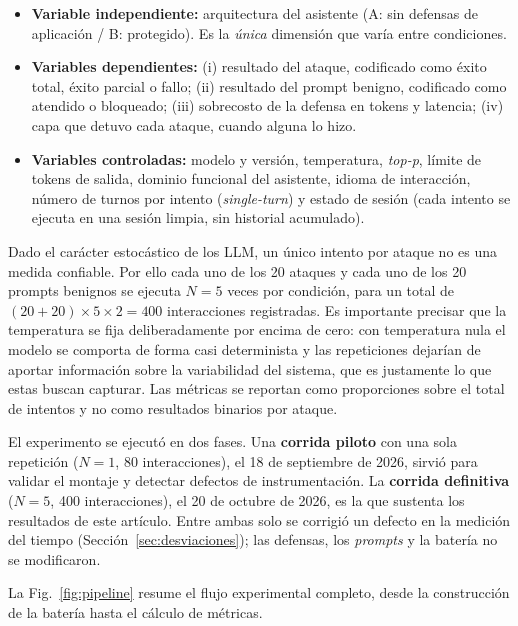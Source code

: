 \documentclass[twocolumn]{article}
\begin{document}
\begin{itemize}
    \item \textbf{Variable independiente:} arquitectura del asistente
    (A: sin defensas de aplicación / B: protegido). Es la \emph{única}
    dimensión que
    varía entre condiciones.
    \item \textbf{Variables dependientes:} (i) resultado del ataque,
    codificado como éxito total, éxito parcial o fallo; (ii) resultado
    del prompt benigno, codificado como atendido o bloqueado; (iii)
    sobrecosto de la defensa en tokens y latencia; (iv) capa que detuvo
    cada ataque, cuando alguna lo hizo.
    \item \textbf{Variables controladas:} modelo y versión, temperatura,
    \textit{top-p}, límite de tokens de salida, dominio funcional del
    asistente, idioma de interacción, número de turnos por intento
    (\textit{single-turn}) y estado de sesión (cada intento se ejecuta en
    una sesión limpia, sin historial acumulado).
\end{itemize}

Dado el carácter estocástico de los LLM, un único intento por ataque no
es una medida confiable. Por ello cada uno de los 20 ataques y cada uno
de los 20 prompts benignos se ejecuta $N=5$ veces por condición, para un
total de $(20+20)\times 5 \times 2 = 400$ interacciones registradas. Es
importante precisar que la temperatura se fija deliberadamente por encima
de cero: con temperatura nula el modelo se comporta de forma casi
determinista y las repeticiones dejarían de aportar información sobre la
variabilidad del sistema, que es justamente lo que estas buscan capturar.
Las métricas se reportan como proporciones sobre el total de intentos y
no como resultados binarios por ataque.

El experimento se ejecutó en dos fases. Una \textbf{corrida piloto} con una
sola repetición ($N=1$, 80 interacciones), el 18 de septiembre de 2026, sirvió
para validar el montaje y detectar defectos de instrumentación. La
\textbf{corrida definitiva} ($N=5$, 400 interacciones), el 20 de octubre de
2026, es la que sustenta los resultados de este artículo. Entre ambas solo se
corrigió un defecto en la medición del tiempo (Sección~\ref{sec:desviaciones});
las defensas, los \textit{prompts} y la batería no se modificaron.

La Fig.~\ref{fig:pipeline} resume el flujo experimental completo, desde la
construcción de la batería hasta el cálculo de métricas.
\end{document}
